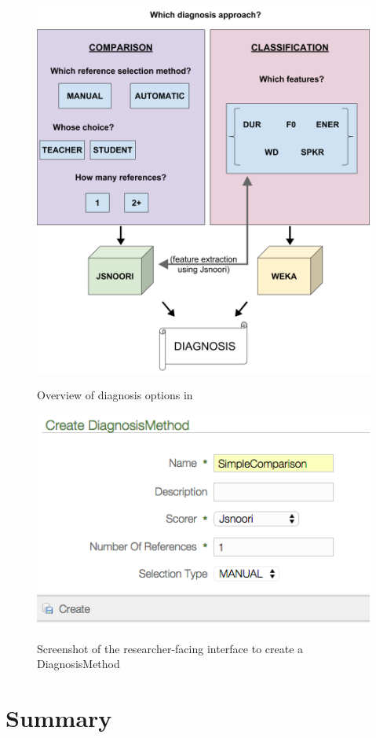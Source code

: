 	\begin{figure}
		\centering
		\caption[Overview of diagnosis options]{Overview of diagnosis options in  }
		\includegraphics[width=\textwidth]{img/DiagnosisMethod}
		\label{fig:diag:system}
	\end{figure}
	
	\begin{figure}
		\centering
		\caption[Creating a DiagnosisMethod]{Screenshot of the researcher-facing interface to create a DiagnosisMethod}
		\includegraphics[width=\textwidth]{img/screenshots/createDiagnosisMethod}
		\label{fig:diag:creatediagnosismethod}
	\end{figure}
	
	

\section{Summary}
\label{sec:diag:summary}


	\TODO{}